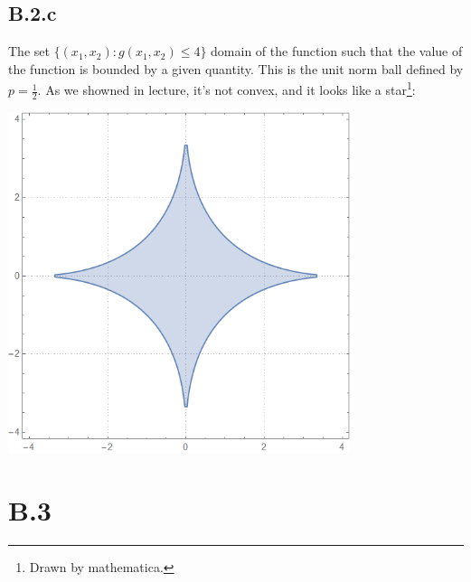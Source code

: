 \documentclass[]{article}
\begin{document}
    \subsection*{B.2.c}
        The set $ \{(x_1, x_2): g(x_1, x_2) \le 4\}$ domain of the function such that the value of the function is bounded by a given quantity. This is the unit norm ball defined by $p = \frac{1}{2}$. As we showned in lecture, it's not convex, and it looks like a star\footnote{Drawn by mathematica. }:  
        \begin{center}
            \includegraphics[width=10cm]{b2-norm-ball.png} 
        \end{center}
    
\section*{B.3}  
\end{document}
